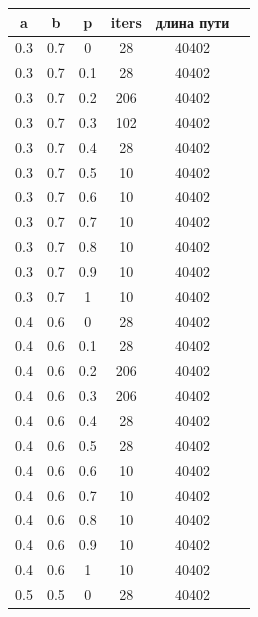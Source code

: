 \documentclass[a4paper,12pt]{article}
\begin{document}
\begin{table}
\begin{minipage}[!h]{0.10\hsize}\centering
	\begin{center}
		\begin{tabular}{c@{\hspace{7mm}}c@{\hspace{7mm}}c@{\hspace{7mm}}c@{\hspace{7mm}}c@{\hspace{7mm}}c}
			
			\toprule
			a        &b      &p      &iters &длина пути \\
			\midrule
			0.3     &0.7    &0      &28    &40402\\
			0.3     &0.7    &0.1    &28    &40402\\
			0.3     &0.7    &0.2    &206   &40402\\
			0.3     &0.7    &0.3    &102   &40402\\
			0.3     &0.7    &0.4    &28    &40402\\
			0.3     &0.7    &0.5    &10    &40402\\
			0.3     &0.7    &0.6    &10    &40402\\
			0.3     &0.7    &0.7    &10    &40402\\
			0.3     &0.7    &0.8    &10    &40402\\
			0.3     &0.7    &0.9    &10    &40402\\
			0.3     &0.7    &1      &10    &40402\\
			\midrule
			0.4     &0.6    &0      &28    &40402\\
			0.4     &0.6    &0.1    &28    &40402\\
			0.4     &0.6    &0.2    &206   &40402\\
			0.4     &0.6    &0.3    &206   &40402\\
			0.4     &0.6    &0.4    &28    &40402\\
			0.4     &0.6    &0.5    &28    &40402\\
			0.4     &0.6    &0.6    &10    &40402\\
			0.4     &0.6    &0.7    &10    &40402\\
			0.4     &0.6    &0.8    &10    &40402\\
			0.4     &0.6    &0.9    &10    &40402\\
			0.4     &0.6    &1      &10    &40402\\
			\midrule
			0.5     &0.5    &0      &28    &40402\\

\end{tabular}
\end{center}
\end{minipage}
\end{table}
\end{document}
